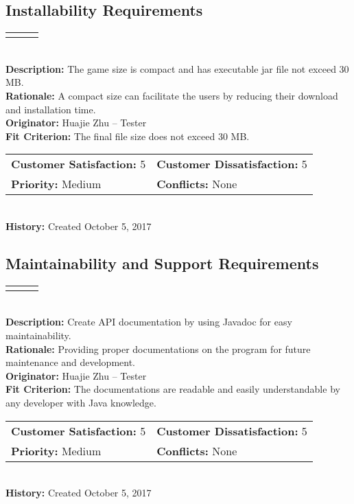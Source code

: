 \documentclass[12pt]{article}
\begin{document}
\subsection{Installability Requirements}

\begin{reqbox}
\begin{tabular}{ccc}\color{red}{Requirement: UFR06}
\end{tabular} \\
\textbf{Description:} The game size is compact and has executable jar file not exceed 30 MB.\\
\textbf{Rationale:} A compact size can facilitate the users by reducing their download and installation time.\\
\textbf{Originator:} Huajie Zhu -- Tester \\
\textbf{Fit Criterion:} The final file size does not exceed 30 MB.\\
\begin{tabular}{ll}
\textbf{Customer Satisfaction:} 5 & \textbf{Customer Dissatisfaction:} 5 \\
\textbf{Priority:} Medium & \textbf{Conflicts:} None\\
\end{tabular} \\
\textbf{History:} Created October 5, 2017
\end{reqbox}


\newpage
\subsection{Maintainability and Support Requirements}

\begin{reqbox}
\begin{tabular}{ccc}\color{red}{Requirement: UFR07}
\end{tabular} \\
\textbf{Description:} Create API documentation by using Javadoc for easy maintainability.\\
\textbf{Rationale:} Providing proper documentations on the program for future maintenance and development.\\
\textbf{Originator:} Huajie Zhu -- Tester \\
\textbf{Fit Criterion:} The documentations are readable and easily understandable by any developer with Java knowledge.\\
\begin{tabular}{ll}
\textbf{Customer Satisfaction:} 5 & \textbf{Customer Dissatisfaction:} 5 \\
\textbf{Priority:} Medium & \textbf{Conflicts:} None\\
\end{tabular} \\
\textbf{History:} Created October 5, 2017
\end{reqbox}
\end{document}
